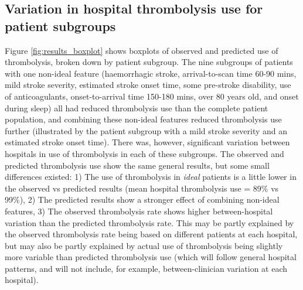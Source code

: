 \subsection{Variation in hospital thrombolysis use for patient subgroups}

Figure \ref{fig:results_boxplot} shows boxplots of observed and predicted use of thrombolysis, broken down by patient subgroup. The nine subgroups of patients with one non-ideal feature (haemorrhagic stroke, arrival-to-scan time 60-90 mins, mild stroke severity, estimated stroke onset time, some pre-stroke disability, use of anticoagulants, onset-to-arrival time 150-180 mins, over 80 years old, and onset during sleep) all had reduced thrombolysis use than the complete patient population, and combining these non-ideal features reduced thrombolysis use further (illustrated by the patient subgroup with a mild stroke severity and an estimated stroke onset time). There was, however, significant variation between hospitals in use of thrombolysis in each of these subgroups. The observed and predicted thrombolysis use show the same general results, but some small differences existed: 1) The use of thrombolysis in \emph{ideal} patients is a little lower in the observed vs predicted results (mean hospital thrombolysis use = 89\% vs 99\%), 2) The predicted results show a stronger effect of combining non-ideal features, 3) The observed thrombolysis rate shows higher between-hospital variation than the predicted thrombolysis rate. This may be partly explained by the observed thrombolysis rate being based on different patients at each hospital, but may also be partly explained by actual use of thrombolysis being slightly more variable than predicted thrombolysis use (which will follow general hospital patterns, and will not include, for example, between-clinician variation at each hospital).


